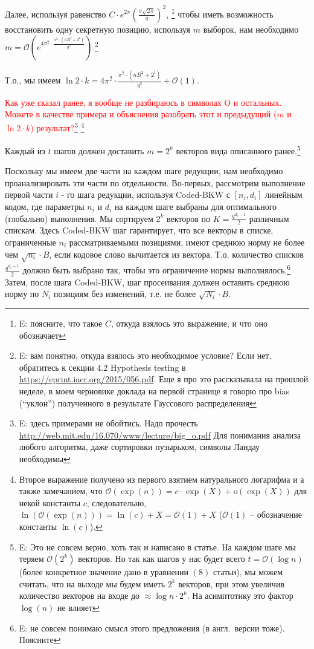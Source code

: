 \documentclass[a4paper,11pt]{article}
\newcommand{\bigO}{\mathcal{O}}
\newcommand{\smallo}{o} %
\begin{document}
Далее, используя равенство $C \cdot e^{2\pi}(\frac{\sigma \sqrt{2\pi}}{q})^2$, \footnote{E: поясните, что такое $C$, откуда взялось это выражение, и что оно обозначает} чтобы иметь возможность восстановить одну секретную позицию, используя $m$ выборок, нам необходимо $m=\bigO\left(e^{4\pi^2 \cdot \frac{\sigma^2 \cdot (nB^2+2^t)}{q^2}}\right)$.\footnote{E: вам понятно, откуда взялось это необходимое условие? Если нет, обратитесь к секции 4.2 Hypothesis testing в \url{https://eprint.iacr.org/2015/056.pdf}. Еще я про это рассказывала на прошлой неделе, в моем черновике доклада на первой странице я говорю про bias (``уклон'') полученного в результате Гауссового распределения }

Т.о., мы имеем $\ln{2} \cdot k = 4\pi^2 \cdot \frac{\sigma^2 \cdot (nB^2+2^t)}{q^2} + \bigO(1)$.

\textcolor{red}{Как уже сказал ранее, я вообще не разбираюсь в символах O и остальных. Можете в качестве примера и объяснения разобрать этот и предыдущий ($m$ и $\ln{2} \cdot k$) результат?}\footnote{E: здесь примерами не обойтись. Надо прочесть \url{http://web.mit.edu/16.070/www/lecture/big_o.pdf}
Для понимания анализа любого алгоритма, даже сортировки пузырьком, символы Ландау необходимы
}
\footnote{Второе выражение получено из первого взятием натурального логарифма и а также замечанием, что $\bigO(\exp(n)) = c \cdot \exp(X) + \smallo(\exp(X))$ для некой константы $c$, следовательно, $ \ln(\bigO(\exp(n)) ) = \ln(c) + X = \bigO(1) + X$ ($\bigO(1)$ -- обозначение константы $\ln(c)$).  }

Каждый из $t$ шагов должен доставить $m=2^k$ векторов вида описанного ранее.\footnote{E: Это не совсем верно, хоть так и написано в статье. На каждом шаге мы теряем $\bigO(2^k)$ векторов. Но так как шагов у нас будет всего $t = \bigO(\log n)$ (более конкретное значение дано в уравнении $(8)$ статьи), мы можем считать, что на выходе мы будем иметь $2^k$ векторов, при этом увеличив количество векторов на входе до $\approx \log n \cdot 2^k$. На асимптотику это фактор $\log(n)$ не влияет}

Поскольку мы имеем две части на каждом шаге редукции, нам необходимо проанализировать эти части по отдельности. Во-первых, рассмотрим выполнение первой части $i$ - го шага редукции, используя Coded-BKW с $[n_i,d_i]$ линейным кодом, где параметры $n_i$ и $d_i$ на каждом шаге выбраны для оптимального (глобально) выполнения. Мы сортируем $2^k$ векторов по $K=\frac{q^{d_i - 1}}{2}$ различным спискам. Здесь Coded-BKW шаг гарантирует, что все векторы в списке, ограниченные $n_i$ рассматриваемыми позициями, имеют среднюю норму не более чем $\sqrt{n_i}\cdot B$, если кодовое слово вычитается из вектора. Т.о. количество списков $\frac{q^{d_i - 1}}{2}$ должно быть выбрано так, чтобы это ограничение нормы выполнялось.\footnote{E: не совсем понимаю смысл этого предложения (в англ.\ версии тоже). Поясните} Затем, после шага Coded-BKW, шаг просеивания должен оставить среднюю норму по $N_i$ позициям без изменений, т.е. не более $\sqrt{N_i}\cdot B$.
\end{document}
